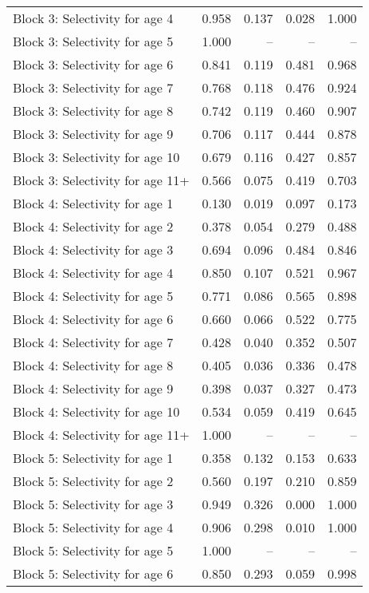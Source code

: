 \documentclass[
]{article}
\begin{document}
\begin{landscape}
\begin{longtable}[t]{lrrrr}
\addlinespace
Block 3: Selectivity for age 4 & 0.958 & 0.137 & 0.028 & 1.000\\
Block 3: Selectivity for age 5 & 1.000 & -- & -- & --\\
Block 3: Selectivity for age 6 & 0.841 & 0.119 & 0.481 & 0.968\\
Block 3: Selectivity for age 7 & 0.768 & 0.118 & 0.476 & 0.924\\
Block 3: Selectivity for age 8 & 0.742 & 0.119 & 0.460 & 0.907\\
\addlinespace
Block 3: Selectivity for age 9 & 0.706 & 0.117 & 0.444 & 0.878\\
Block 3: Selectivity for age 10 & 0.679 & 0.116 & 0.427 & 0.857\\
Block 3: Selectivity for age 11+ & 0.566 & 0.075 & 0.419 & 0.703\\
Block 4: Selectivity for age 1 & 0.130 & 0.019 & 0.097 & 0.173\\
Block 4: Selectivity for age 2 & 0.378 & 0.054 & 0.279 & 0.488\\
\addlinespace
Block 4: Selectivity for age 3 & 0.694 & 0.096 & 0.484 & 0.846\\
Block 4: Selectivity for age 4 & 0.850 & 0.107 & 0.521 & 0.967\\
Block 4: Selectivity for age 5 & 0.771 & 0.086 & 0.565 & 0.898\\
Block 4: Selectivity for age 6 & 0.660 & 0.066 & 0.522 & 0.775\\
Block 4: Selectivity for age 7 & 0.428 & 0.040 & 0.352 & 0.507\\
\addlinespace
Block 4: Selectivity for age 8 & 0.405 & 0.036 & 0.336 & 0.478\\
Block 4: Selectivity for age 9 & 0.398 & 0.037 & 0.327 & 0.473\\
Block 4: Selectivity for age 10 & 0.534 & 0.059 & 0.419 & 0.645\\
Block 4: Selectivity for age 11+ & 1.000 & -- & -- & --\\
Block 5: Selectivity for age 1 & 0.358 & 0.132 & 0.153 & 0.633\\
\addlinespace
Block 5: Selectivity for age 2 & 0.560 & 0.197 & 0.210 & 0.859\\
Block 5: Selectivity for age 3 & 0.949 & 0.326 & 0.000 & 1.000\\
Block 5: Selectivity for age 4 & 0.906 & 0.298 & 0.010 & 1.000\\
Block 5: Selectivity for age 5 & 1.000 & -- & -- & --\\
Block 5: Selectivity for age 6 & 0.850 & 0.293 & 0.059 & 0.998\\

\end{longtable}
\end{landscape}
\end{document}
